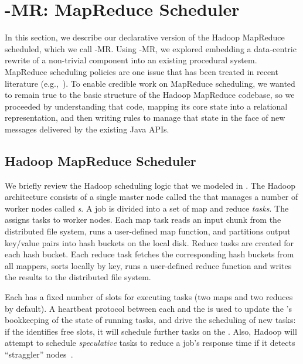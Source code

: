 \section{\BOOM-MR: MapReduce Scheduler}
\label{ch:boom:sec:port}

In this section, we describe our declarative version of the Hadoop MapReduce
scheduled, which we call \BOOM-MR.  Using \BOOM-MR, we explored embedding a
data-centric rewrite of a non-trivial component into an existing procedural
system.  MapReduce scheduling policies are one issue that has been treated in
recent literature (e.g.,~\cite{zaharia-late,delay-sched}).  To enable credible
work on MapReduce scheduling, we wanted to remain true to the basic structure
of the Hadoop MapReduce codebase, so we proceeded by understanding that code,
mapping its core state into a relational representation, and then writing
\OVERLOG rules to manage that state in the face of new messages delivered by
the existing Java APIs. 

\subsection{Hadoop MapReduce Scheduler}
\label{ch:boom:sec:hadoop}

We briefly review the Hadoop scheduling logic that we modeled in \OVERLOG.  The
Hadoop architecture consists of a single master node called the {\em \JT} that
manages a number of worker nodes called {\em {\TT}s}.  A job is divided into a
set of map and reduce {\em tasks}.  The {\JT} assigns tasks to worker nodes.
Each map task reads an input chunk from the distributed file system, runs a
user-defined map function, and partitions output key/value pairs into hash
buckets on the local disk.  Reduce tasks are created for each hash bucket.
Each reduce task fetches the corresponding hash buckets from all mappers, sorts
locally by key, runs a user-defined reduce function and writes the results to
the distributed file system.

Each {\TT} has a fixed number of slots for executing tasks (two maps and two
reduces by default).  A heartbeat protocol between each {\TT} and the {\JT} is
used to update the {\JT}'s bookkeeping of the state of running tasks, and drive
the scheduling of new tasks: if the {\JT} identifies free {\TT} slots, it will
schedule further tasks on the {\TT}.  Also, Hadoop will attempt to schedule
{\em speculative} tasks to reduce a job's response time if it detects
``straggler'' nodes~\cite{mapreduce-osdi}.

